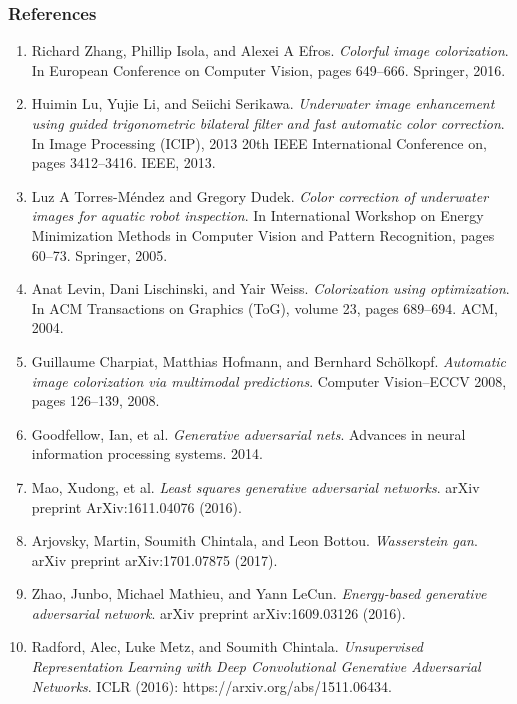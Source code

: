 \documentclass{beamer}
\begin{document}
\begin{frame}
\frametitle{\textbf{References}}
\tiny
\begin{enumerate}
\item Richard Zhang, Phillip Isola, and Alexei A Efros. \textit{Colorful image colorization}. In European Conference on Computer Vision,
pages 649–666. Springer, 2016.
\item Huimin Lu, Yujie Li, and Seiichi Serikawa. \textit{Underwater image enhancement using guided trigonometric bilateral filter and fast
automatic color correction}. In Image Processing (ICIP), 2013 20th IEEE International Conference on, pages 3412–3416. IEEE, 2013.
\item Luz A Torres-Méndez and Gregory Dudek. \textit{Color correction of underwater images for aquatic robot inspection}. In International
Workshop on Energy Minimization Methods in Computer Vision and Pattern Recognition, pages 60–73. Springer, 2005.
\item Anat Levin, Dani Lischinski, and Yair Weiss. \textit{Colorization using optimization}. In ACM Transactions on Graphics (ToG), volume 23, pages 689–694. ACM, 2004.
\item Guillaume Charpiat, Matthias Hofmann, and Bernhard Schölkopf. \textit{Automatic image colorization via multimodal predictions}. Computer Vision–ECCV 2008, pages 126–139, 2008.
\item Goodfellow, Ian, et al. \textit{Generative adversarial nets}. Advances in neural information processing systems. 2014.
\item Mao, Xudong, et al. \textit{Least squares generative adversarial networks}. arXiv preprint ArXiv:1611.04076 (2016).
\item Arjovsky, Martin, Soumith Chintala, and Leon Bottou. \textit{Wasserstein gan}. arXiv preprint arXiv:1701.07875 (2017).
\item Zhao, Junbo, Michael Mathieu, and Yann LeCun. \textit{Energy-based generative adversarial network}. arXiv preprint arXiv:1609.03126 (2016).
\item Radford, Alec, Luke Metz, and Soumith Chintala. \textit{Unsupervised Representation Learning with Deep Convolutional Generative Adversarial Networks}. ICLR (2016): https://arxiv.org/abs/1511.06434.










\end{enumerate}
\end{frame}
\end{document}
